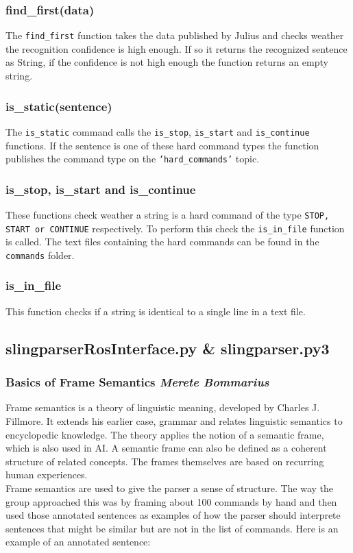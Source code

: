 \documentclass[main.tex]{subfiles}
\begin{document}
        \subsubsection{find\_first(data)}
            The \texttt{find\_first} function takes the data published by Julius and checks weather the recognition confidence is high enough. If so it returns the recognized sentence as String, if the confidence is not high enough the function returns an empty string.\\
    
        \subsubsection{is\_static(sentence)}
            The \texttt{is\_static} command calls the \texttt{is\_stop}, \texttt{is\_start} and \texttt{is\_continue} functions. If the sentence is one of these hard command types the function publishes the command type on the \texttt{'hard\_commands'} topic.
    
        \subsubsection{is\_stop, is\_start and is\_continue}
            These functions check weather a string is a hard command of the type \texttt{STOP, START or CONTINUE} respectively. To perform this check the \texttt{is\_in\_file} function is called. The text files containing the hard commands can be found in the \texttt{commands} folder.
    
        \subsubsection{is\_in\_file}
            This function checks if a string is identical to a single line in a text file.
    
    \subsection{slingparserRosInterface.py \& slingparser.py3}     	
        \subsubsection{Basics of Frame Semantics \small{\textit{Merete Bommarius}}}        
            Frame semantics is a theory of linguistic meaning, developed by Charles J. Fillmore. It extends his earlier case, grammar and relates linguistic semantics to encyclopedic knowledge. The theory applies the notion of a semantic frame, which is also used in AI. A semantic frame can also be defined as a coherent structure of related concepts. The frames themselves are based on recurring human experiences.\\
            Frame semantics are used to give the parser a sense of structure. The way the group approached this was by framing about 100 commands by hand and then used those annotated sentences as examples of how the parser should interprete sentences that might be similar but are not in the list of commands. 
            Here is an example of an annotated sentence: 
    
\end{document}
